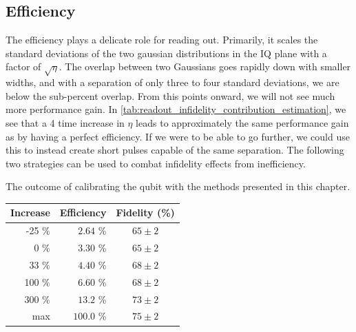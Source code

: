 \subsection{Efficiency}
The efficiency plays a delicate role for reading out. Primarily, it scales the standard deviations of the two gaussian distributions in the IQ plane with a factor of $\sqrt{\eta}$. The overlap between two Gaussians goes rapidly down with smaller widths, and with a separation of only three to four standard deviations, we are below the sub-percent overlap. From this points onward, we will not see much more performance gain. In \ref{tab:readout_infidelity_contribution_estimation}, we see that a 4 time increase in $\eta$ leads to approximately the same performance gain as by having a perfect efficiency. If we were to be able to go further, we could use this to instead create short pulses capable of the same separation. The following two strategies can be used to combat infidelity effects from inefficiency.


\begin{margintable}
\centering
\caption{The outcome of calibrating the qubit with the methods presented in this chapter.}
\begin{tabular}{rr|c}
\hline
\textbf{Increase}       &  Efficiency       & Fidelity (\%)\\ \hline
-25 \%                  &  $\;2.64$ \%        &  $65 \pm 2$\\
0   \%                  &  $\;3.30$ \%        &  $65 \pm 2$\\
33  \%                  &  $\;4.40$ \%        &  $68 \pm 2$\\
100  \%                 &  $\;6.60$ \%        &  $68 \pm 2$\\
300  \%                 &  $13.2$ \%          &  $73 \pm 2$\\
max                     &  $100.0$ \%         &  $75 \pm 2$\\
\end{tabular}
\label{tab:readout_infidelity_contribution_estimation}
\end{margintable}

